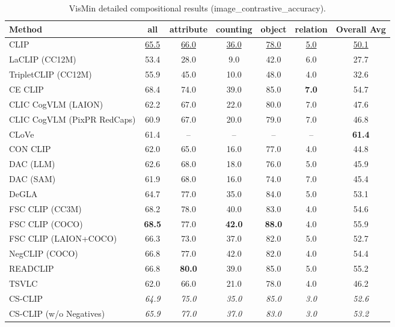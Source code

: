 \begin{table}[t]
  \centering
  \scriptsize
  \caption{VisMin detailed compositional results (image_contrastive_accuracy).}
  \label{tab:VisMin_detailed}
  \begin{adjustbox}{max width=\textwidth}
  \setlength{\tabcolsep}{2pt}
  \begin{tabular}{p{5cm}c|c|c|c|c|c}
    \toprule
    Method & all & attribute & counting & object & relation & Overall Avg \\
    \midrule
    CLIP & \underline{65.5} & \underline{66.0} & \underline{36.0} & \underline{78.0} & \underline{5.0} & \underline{50.1} \\
    \midrule
    LaCLIP (CC12M) & 53.4 & 28.0 & 9.0 & 42.0 & 6.0 & 27.7 \\
    TripletCLIP (CC12M) & 55.9 & 45.0 & 10.0 & 48.0 & 4.0 & 32.6 \\
    \midrule
    CE CLIP & 68.4 & 74.0 & 39.0 & 85.0 & \textbf{7.0} & 54.7 \\
    CLIC CogVLM (LAION) & 62.2 & 67.0 & 22.0 & 80.0 & 7.0 & 47.6 \\
    CLIC CogVLM (PixPR RedCaps) & 60.9 & 67.0 & 20.0 & 79.0 & 7.0 & 46.8 \\
    CLoVe & 61.4 & -- & -- & -- & -- & \textbf{61.4} \\
    CON CLIP & 62.0 & 65.0 & 16.0 & 77.0 & 4.0 & 44.8 \\
    DAC (LLM) & 62.6 & 68.0 & 18.0 & 76.0 & 5.0 & 45.9 \\
    DAC (SAM) & 61.9 & 68.0 & 16.0 & 74.0 & 7.0 & 45.4 \\
    DeGLA & 64.7 & 77.0 & 35.0 & 84.0 & 5.0 & 53.1 \\
    FSC CLIP (CC3M) & 68.2 & 78.0 & 40.0 & 83.0 & 4.0 & 54.6 \\
    FSC CLIP (COCO) & \textbf{68.5} & 77.0 & \textbf{42.0} & \textbf{88.0} & 4.0 & 55.9 \\
    FSC CLIP (LAION+COCO) & 66.3 & 73.0 & 37.0 & 82.0 & 5.0 & 52.7 \\
    NegCLIP (COCO) & 66.8 & 77.0 & 42.0 & 82.0 & 4.0 & 54.4 \\
    READCLIP & 66.8 & \textbf{80.0} & 39.0 & 85.0 & 5.0 & 55.2 \\
    TSVLC & 62.0 & 66.0 & 21.0 & 78.0 & 4.0 & 46.2 \\
    \midrule
    CS-CLIP & \emph{64.9} & \emph{75.0} & \emph{35.0} & \emph{85.0} & \emph{3.0} & \emph{52.6} \\
    CS-CLIP (w/o Negatives) & \emph{65.9} & \emph{77.0} & \emph{37.0} & \emph{83.0} & \emph{3.0} & \emph{53.2} \\
    \bottomrule
  \end{tabular}
  \end{adjustbox}
\end{table}

